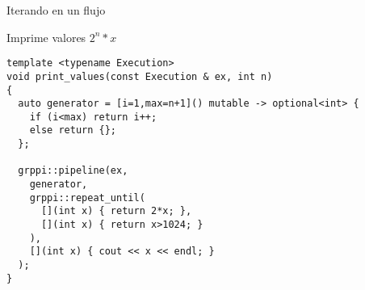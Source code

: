 \begin{frame}[t,fragile]{Iterando en un flujo}
\begin{block}{Imprime valores $2^n*x$}
\begin{lstlisting}
template <typename Execution>
void print_values(const Execution & ex, int n)
{
  auto generator = [i=1,max=n+1]() mutable -> optional<int> {
    if (i<max) return i++;
    else return {};
  };

  grppi::pipeline(ex,
    generator,
    grppi::repeat_until(
      [](int x) { return 2*x; },
      [](int x) { return x>1024; }
    ),
    [](int x) { cout << x << endl; }
  );
}
\end{lstlisting}
\end{block}
\end{frame}
